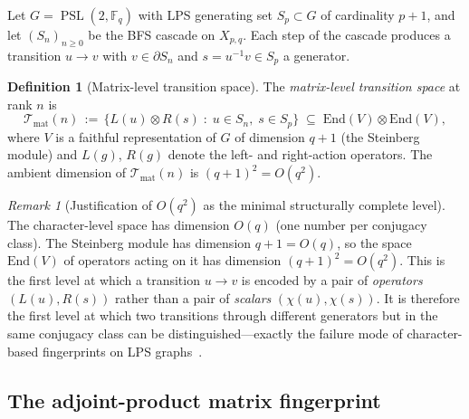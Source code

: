 \documentclass[11pt]{article}
\theoremstyle{definition}
\newtheorem{definition}[theorem]{Definition}
\theoremstyle{remark}
\newtheorem{remark}[theorem]{Remark}
\DeclareMathOperator{\PSL}{PSL}
\newcommand{\F}{\mathbb{F}}
\newcommand{\Tmat}{\mathcal{T}_{\mathrm{mat}}}
\begin{document}
    Let $G = \PSL(2, \F_q)$ with LPS generating set $S_p \subset G$ of cardinality $p+1$,
    and let $(S_n)_{n \geq 0}$ be the BFS cascade on $X_{p,q}$.
    Each step of the cascade produces a transition $u \to v$ with $v \in \partial S_n$
    and $s = u^{-1} v \in S_p$ a generator.

    \begin{definition}[Matrix-level transition space]
      \label{def:matspace}
      The \emph{matrix-level transition space} at rank $n$ is
      \begin{equation}
        \Tmat(n) \,:=\, \bigl\{ L(u) \otimes R(s) \;:\; u \in S_n,\; s \in S_p \bigr\}
        \;\subseteq\; \mathrm{End}(V) \otimes \mathrm{End}(V),
      \end{equation}
      where $V$ is a faithful representation of $G$ of dimension $q+1$ (the Steinberg
      module) and $L(g)$, $R(g)$ denote the left- and right-action operators.
      The ambient dimension of $\Tmat(n)$ is $(q+1)^2 = O(q^2)$.
    \end{definition}

    \begin{remark}[Justification of $O(q^2)$ as the minimal structurally complete level]
      \label{rem:q2-minimal}
      The character-level space has dimension $O(q)$ (one number per conjugacy class).
      The Steinberg module has dimension $q + 1 = O(q)$, so the space $\mathrm{End}(V)$ of
      operators acting on it has dimension $(q+1)^2 = O(q^2)$.
      This is the first level at which a transition $u \to v$ is encoded by a pair of
      \emph{operators} $(L(u), R(s))$ rather than a pair of \emph{scalars} $(\chi(u), \chi(s))$.
      It is therefore the first level at which two transitions through different generators but
      in the same conjugacy class can be distinguished---exactly the failure mode of character-based
      fingerprints on LPS graphs~\cite{Beau2026a9}.
    \end{remark}

  \subsection{The adjoint-product matrix fingerprint}
    \label{ssec:fingerprint}
\end{document}
